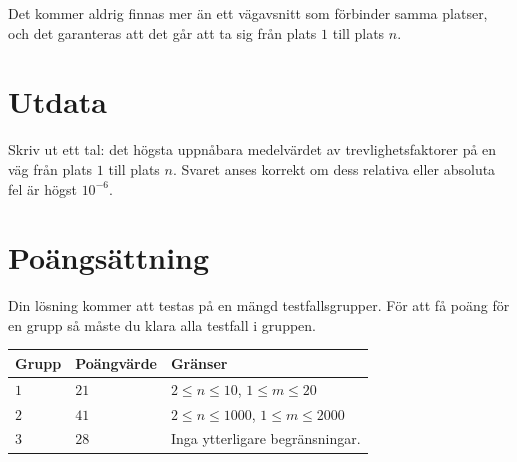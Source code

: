 Det kommer aldrig finnas mer än ett vägavsnitt som förbinder samma platser, och det garanteras
att det går att ta sig från plats $1$ till plats $n$.

\section*{Utdata}
Skriv ut ett tal: det högsta uppnåbara medelvärdet av trevlighetsfaktorer på en väg från plats $1$ till plats $n$.
Svaret anses korrekt om dess relativa eller absoluta fel är högst $10^{-6}$.

\section*{Poängsättning}
Din lösning kommer att testas på en mängd testfallsgrupper. För att få poäng för en grupp så måste du klara alla testfall i gruppen.

\noindent
\begin{tabular}{| l | l | p{12cm} |}
  \hline
  Grupp & Poängvärde & Gränser \\ \hline
  $1$   & $21$       & $2 \le n \le 10$, $1 \le m \le 20$ \\ \hline
  $2$   & $41$       & $2 \le n \le 1000$, $1 \le m \le 2000$\\ \hline
  $3$   & $28$       & Inga ytterligare begränsningar. \\ \hline
\end{tabular}